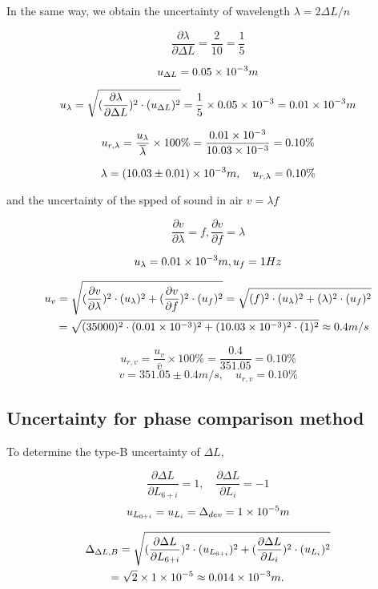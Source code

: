 In the same way, we obtain the uncertainty of wavelength $\lambda=2\Delta L/n$ 


$$\frac{\partial \lambda}{\partial \Delta L}=\frac{2}{10}=\frac{1}{5}$$

$$u_{\Delta L}=0.05\times 10^{-3}m$$

$$u_{\lambda}=\sqrt{(\frac{\partial \lambda}{\partial \Delta L})^2\cdot 
  (u_{\Delta L})^2}
  =\frac{1}{5}\times 0.05\times 10^{-3}=0.01\times 10^{-3}m$$

$$u_{r,\lambda}=\frac{u_{\lambda}}{\overline{\lambda}}\times 
100\%=\frac{0.01\times 10^{-3}}{10.03\times 10^{-3}}=0.10\%$$

$$\lambda=(10.03\pm0.01)\times 10^{-3}m,\quad u_{r,\lambda}=0.10\%$$


and the uncertainty of the spped of sound in air $v=\lambda f$

$$\frac{\partial v}{\partial \lambda}=f,
\frac{\partial v}{\partial f}=\lambda$$

$$u_{\lambda}=0.01\times 10^{-3}m, 
u_{f}=1Hz$$

\[
\begin{split}
&u_{v}=\sqrt{(\frac{\partial v}{\partial \lambda})^2\cdot
  (u_{\lambda})^2+(\frac{\partial v}{\partial f})^2\cdot
  (u_{f})^2}=\sqrt{(f)^2\cdot (u_{\lambda})^2+(\lambda)^2\cdot
  (u_{f})^2}\\ 
&\quad =\sqrt{(35000)^2\cdot(0.01\times 10^{-3})^2+(10.03\times 10^{-3})^2\cdot(1)^2}
\approx0.4m/s\\
\end{split}
\]

$$u_{r,v}=\frac{u_v}{\overline{v}}\times 100\%=\frac{0.4}{351.05}=0.10\%$$
$$v=351.05\pm0.4 m/s,\quad u_{r,v}=0.10\%$$

\subsection{Uncertainty for phase comparison method}

To determine the type-B uncertainty of $\Delta L$,


$$\frac{\partial \Delta L}{\partial L_{6+i}}=1,
\quad \frac{\partial \Delta L}{\partial L_i}=-1$$ 
$$u_{L_{6+i}}=u_{L_i}=\Delta_{dev}=1\times 10^{-5}m$$


\[
\begin{split}
    &\Delta_{\Delta L,B}=\sqrt{(\frac{\partial \Delta L}{\partial
        L_{6+i}})^2\cdot (u_{L_{6+i}})^2+(\frac{\partial \Delta L}{\partial
        L_i})^2\cdot (u_{L_i})^2}\\ 
    &\quad\quad =\sqrt{2}\times 1\times 10^{-5}\approx0.014\times 10^{-3}m.\\ 
\end{split}
\]

